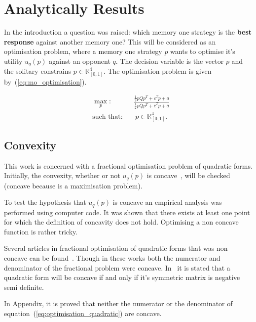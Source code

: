 \documentclass[10pt]{article}
\newcommand{\R}{\mathbb{R}}
\begin{document}
\section{Analytically Results}

In the introduction a question was raised: which memory one strategy is the \textbf{best response}
against another memory one? This will be considered as an optimisation problem,
where a memory one strategy \(p\) wants to optimise it's utility \(u_q(p)\)
against an opponent \(q\). The decision variable is the vector \(p\) and the
solitary constrains \(p \in \R^4_{[0, 1]} \). The optimisation problem is
given by~(\ref{eq:mo_optimisation}).

\begin{equation}\label{eq:mo_optimisation}
\begin{aligned}
& \max_p: && \frac{\frac{1}{2}  p  Q  p^T + c^T p + a} 
                  {\frac{1}{2}  p  \bar{Q}  p^T + \bar{c}^T  p + \bar{a}}
\\
& \text{such that}: && \ p \in \R^4_{[0, 1]}.
\end{aligned}
\end{equation}

\subsection{Convexity}

This work is concerned with a fractional optimisation problem of quadratic forms.
Initially, the convexity, whether or not \(u_{q}(p)\) is concave~\cite{Gradshteyn2007},
will be checked (concave because is a maximisation  problem).

To test the hypothesis that \(u_q(p)\) is concave an empirical analysis
was performed using computer code. %
It was shown that there exists at least one point for which the definition of
concavity does not hold. Optimising a non concave function is rather tricky.

Several articles in fractional optimisation of quadratic forms that was non concave
can be found~\cite{Beck2009, Hongyan2014}. Though in these works both the numerator
and denominator of the fractional problem were concave. In~\cite{Anton2014} it is
stated that a quadratic form will be concave if and only if it's symmetric matrix is
negative semi definite.

In Appendix, it is proved that neither the numerator or the denominator of
equation~(\ref{eq:optimisation_quadratic}) are concave.
\end{document}
